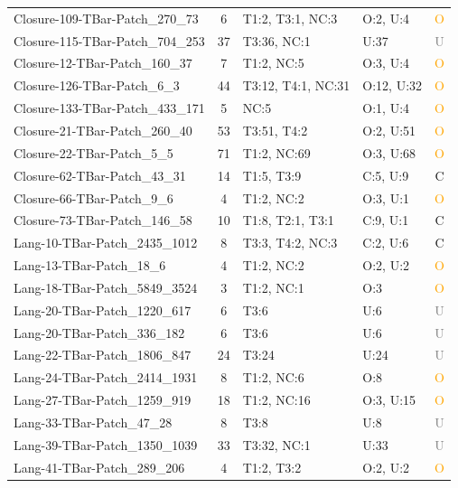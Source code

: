 \begin{longtable}{l|c|l|l|c}
Closure-109-TBar-Patch\_270\_73 & 6 & T1:2, T3:1, NC:3 & O:2, U:4 & \textcolor{orange}{O} \\
Closure-115-TBar-Patch\_704\_253 & 37 & T3:36, NC:1 & U:37 & \textcolor{gray}{U} \\
Closure-12-TBar-Patch\_160\_37 & 7 & T1:2, NC:5 & O:3, U:4 & \textcolor{orange}{O} \\
Closure-126-TBar-Patch\_6\_3 & 44 & T3:12, T4:1, NC:31 & O:12, U:32 & \textcolor{orange}{O} \\
Closure-133-TBar-Patch\_433\_171 & 5 & NC:5 & O:1, U:4 & \textcolor{orange}{O} \\
Closure-21-TBar-Patch\_260\_40 & 53 & T3:51, T4:2 & O:2, U:51 & \textcolor{orange}{O} \\
Closure-22-TBar-Patch\_5\_5 & 71 & T1:2, NC:69 & O:3, U:68 & \textcolor{orange}{O} \\
Closure-62-TBar-Patch\_43\_31 & 14 & T1:5, T3:9 & C:5, U:9 & \textcolor{green!60!black}{C} \\
Closure-66-TBar-Patch\_9\_6 & 4 & T1:2, NC:2 & O:3, U:1 & \textcolor{orange}{O} \\
Closure-73-TBar-Patch\_146\_58 & 10 & T1:8, T2:1, T3:1 & C:9, U:1 & \textcolor{green!60!black}{C} \\
Lang-10-TBar-Patch\_2435\_1012 & 8 & T3:3, T4:2, NC:3 & C:2, U:6 & \textcolor{green!60!black}{C} \\
Lang-13-TBar-Patch\_18\_6 & 4 & T1:2, NC:2 & O:2, U:2 & \textcolor{orange}{O} \\
Lang-18-TBar-Patch\_5849\_3524 & 3 & T1:2, NC:1 & O:3 & \textcolor{orange}{O} \\
Lang-20-TBar-Patch\_1220\_617 & 6 & T3:6 & U:6 & \textcolor{gray}{U} \\
Lang-20-TBar-Patch\_336\_182 & 6 & T3:6 & U:6 & \textcolor{gray}{U} \\
Lang-22-TBar-Patch\_1806\_847 & 24 & T3:24 & U:24 & \textcolor{gray}{U} \\
Lang-24-TBar-Patch\_2414\_1931 & 8 & T1:2, NC:6 & O:8 & \textcolor{orange}{O} \\
Lang-27-TBar-Patch\_1259\_919 & 18 & T1:2, NC:16 & O:3, U:15 & \textcolor{orange}{O} \\
Lang-33-TBar-Patch\_47\_28 & 8 & T3:8 & U:8 & \textcolor{gray}{U} \\
Lang-39-TBar-Patch\_1350\_1039 & 33 & T3:32, NC:1 & U:33 & \textcolor{gray}{U} \\
Lang-41-TBar-Patch\_289\_206 & 4 & T1:2, T3:2 & O:2, U:2 & \textcolor{orange}{O} \\

\end{longtable}
